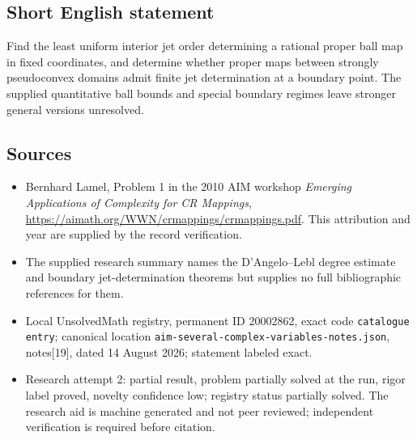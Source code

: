 \documentclass[11pt]{article}
\begin{document}
\subsection{Short English statement}
Find the least uniform interior jet order determining a rational proper ball map in fixed coordinates, and determine whether proper maps between strongly pseudoconvex domains admit finite jet determination at a boundary point. The supplied quantitative ball bounds and special boundary regimes leave stronger general versions unresolved.
\subsection{Sources}
\begin{itemize}
\item Bernhard Lamel, Problem 1 in the 2010 AIM workshop \emph{Emerging Applications of Complexity for CR Mappings}, \url{https://aimath.org/WWN/crmappings/crmappings.pdf}. This attribution and year are supplied by the record verification.
\item The supplied research summary names the D'Angelo--Lebl degree estimate and boundary jet-determination theorems but supplies no full bibliographic references for them.
\item Local UnsolvedMath registry, permanent ID 20002862, exact code \texttt{catalogue entry}; canonical location \texttt{aim-several-complex-variables-notes.json}, notes[19], dated 14 August 2026; statement labeled exact.
\item Research attempt 2: partial result, problem partially solved at the run, rigor label proved, novelty confidence low; registry status partially solved. The research aid is machine generated and not peer reviewed; independent verification is required before citation.
\end{itemize}
\end{document}
